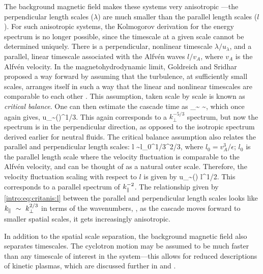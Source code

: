     The background magnetic field makes these systems very anisotropic \cite{goldreich95,
    goldreich97}---the
    perpendicular length scales ($\lambda$) are much smaller than the parallel length
    scales ($l$). For such anisotropic systems, the Kolmogorov derivation for the energy spectrum is no longer
    possible, since the timescale at a given scale cannot be determined uniquely. There
    is a perpendicular, nonlinear timescale $\lambda/u_\lambda$, and a parallel,
    linear timescale associated with the Alfv\'{e}n waves $l/v_A$,
    where $v_A$ is the Alfv\'{e}n velocity. In the magnetohydrodynamic limit, Goldreich and Sridhar \cite{goldreich95,
    goldreich97} proposed a way forward by assuming that the turbulence, at sufficiently
    small scales, arranges itself in such a way that the linear and nonlinear
    timescales are comparable to each other \cite{galtier00, schekochihin12}. This assumption, taken scale by scale is
    known as \textit{critical balance}. One can then estimate the cascade time as
    \beq
        \tau_\lambda \sim {} \sim {},
    \eeq
    which once again gives,
    \beq
        u_\lambda \sim (\epsilon \lambda)^{1/3}.
    \eeq
    This again corresponds to a $k_\perp^{-5/3}$ spectrum, but now the spectrum is in the
    perpendicular direction, as opposed to the isotropic spectrum derived earlier for neutral
    fluids.
    The critical balance
    assumption also relates the parallel and perpendicular length scales:
    \beq
        l \sim l_0^{1/3}\lambda^{2/3}, \label{intro:eq:critanis:l}
    \eeq
    where $l_0 = v_A^3/\epsilon$; $l_0$ is the parallel length scale where the velocity
    fluctuation is comparable to the Alfv\'{e}n velocity, and can be thought of as a
    natural outer scale. Therefore, the velocity fluctuation scaling with respect to $l$
    is given by 
    \beq
        u_\lambda \sim \lt(\rt) l^{1/2}.
    \eeq
    This corresponds to a parallel spectrum of
    $k_\parallel^{-2}$. The relationship given by \eqref{intro:eq:critanis:l} between the parallel and
    perpendicular length scales looks like $k_\parallel~\sim~k_\perp^{2/3}$ in terms of the
    wavenumbers, \ie, as the cascade moves forward to smaller spatial scales, it gets
    increasingly anisotropic.

    In addition to the spatial scale separation, the background magnetic field also
    separates timescales. The cyclotron motion may be assumed to be much faster than any
    timescale of interest in
    the system---this allows for reduced descriptions of kinetic plasmas, which are
    discussed further in  and .

